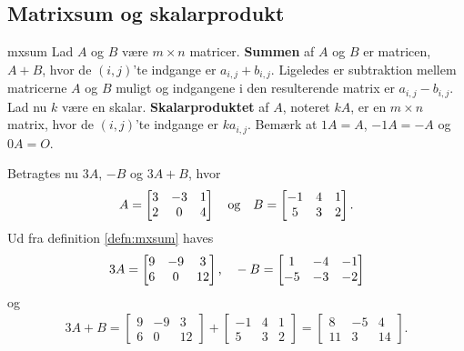 \subsection{Matrixsum og skalarprodukt}
%
\begin{defn}{}{mxsum}
Lad $A$ og $B$ være $m \times n$ matricer.
\textbf{Summen} af $A$ og $B$  er matricen, $A + B$, hvor de $(i,j)$'te indgange er $a_{i,j} + b_{i,j}$.
Ligeledes er subtraktion mellem matricerne $A$ og $B$ muligt og indgangene i den resulterende matrix er $a_{i,j} - b_{i,j}$.
Lad nu $k$ være en skalar.
\textbf{Skalarproduktet} af $A$, noteret $kA$, er en $m \times n$ matrix, hvor de $(i,j)$'te indgange er $ka_{i,j}$.
Bemærk at $1A = A$, $-1A = -A$ og $0A = O$.
\end{defn}
%
\begin{eks}
Betragtes nu $3A$, $-B$ og $3A+B$, hvor 
\begin{align*}
A= 
\begin{bmatrix}
3	&	-3	&	1\\
2	&	0	&	4
\end{bmatrix}
\text{\phantom{---}og\phantom{---}}
B= 
\begin{bmatrix}
-1	&	4	&	1\\
5	&	3	&	2
\end{bmatrix}.
\end{align*}
Ud fra definition \ref{defn:mxsum} haves
\begin{align*}
3A= 
\begin{bmatrix}
9	&	-9	&	3\\
6	&	0	&	12
\end{bmatrix}
\text{,\phantom{---}}
-B= 
\begin{bmatrix}
1	&	-4	&	-1\\
-5	&	-3	&	-2
\end{bmatrix}
\end{align*}
og
\begin{align*}
3A+B= 
\begin{bmatrix}
9	&	-9	&	3\\
6	&	0	&	12
\end{bmatrix}
+ 
\begin{bmatrix}
-1	&	4	&	1\\
5	&	3	&	2
\end{bmatrix}
=
\begin{bmatrix}
8	&	-5	&	4\\
11	&	3	&	14
\end{bmatrix}.
\end{align*}
\end{eks}